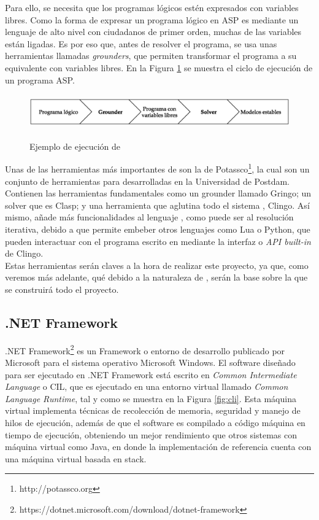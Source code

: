 Para ello, se necesita que los programas lógicos estén expresados con variables libres. Como la forma de expresar un programa lógico en ASP es mediante un lenguaje de alto nivel con ciudadanos de primer orden, muchas de las variables están ligadas. Es por eso que, antes de resolver el programa, se usa unas herramientas llamadas \textit{grounders}, que permiten transformar el programa a su equivalente con variables libres. En la Figura \ref{fig:asp} se muestra el ciclo de ejecución de un programa ASP. \\

\begin{figure}[h]
	\centering
	\includegraphics[height=4em]{images/ASP}
	\label{fig:asp}
	\caption{Ejemplo de ejecución de \asp}
\end{figure}

Unas de las herramientas más importantes de \asp son la de Potassco\footnote{http://potassco.org}, la cual son un conjunto de herramientas para \asp desarrolladas en la Universidad de Postdam. Contienen las herramientas fundamentales como un grounder llamado Gringo; un solver que es Clasp; y una herramienta que aglutina todo el sistema \asp, Clingo. Así mismo, añade más funcionalidades al lenguaje \asp, como puede ser al resolución iterativa, debido a que permite embeber otros lenguajes como Lua o Python, que pueden interactuar con el programa escrito en \asp mediante la interfaz o \textit{API built-in} de Clingo. \\

Estas herramientas serán claves a la hora de realizar este proyecto, ya que, como veremos más adelante, qué debido a la naturaleza de \asp, serán la base sobre la que se construirá todo el proyecto.

\subsection{.NET Framework}

.NET Framework\footnote{https://dotnet.microsoft.com/download/dotnet-framework} es un Framework o entorno de desarrollo publicado por Microsoft para el sistema operativo Microsoft Windows. El software diseñado para ser ejecutado en .NET Framework está escrito en \textit{Common Intermediate Language} o CIL, que es ejecutado en una entorno virtual llamado \textit{Common Language Runtime}, tal y como se muestra en la Figura \ref{fig:cli}. Esta máquina virtual implementa técnicas de recolección de memoria, seguridad y manejo de hilos de ejecución, además de que el software es compilado a código máquina en tiempo de ejecución, obteniendo un mejor rendimiento que otros sistemas con máquina virtual como Java, en donde la implementación de referencia cuenta con una máquina virtual basada en stack. \\

